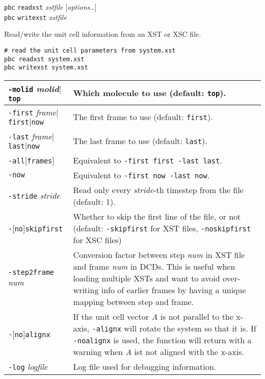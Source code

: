 \documentclass[a4paper, DIV12]{scrartcl}
\begin{document}
\texttt{pbc} \texttt{readxst} \textit{xstfile} [\textit{options}\dots]\\
\texttt{pbc} \texttt{writexst} \textit{xstfile}

Read/write the unit cell information from an XST or XSC file.

\begin{Verbatim}
# read the unit cell parameters from system.xst
pbc readxst system.xst
pbc writexst system.xst
\end{Verbatim}


\begin{tabular}{|p{}|p{}|}
\hline

\texttt{-molid} \textit{molid}$|$\texttt{top}
& Which molecule to use (default: \texttt{top}).
\\ \hline

\texttt{-first} \textit{frame}$|$\texttt{first}$|$\texttt{now}
& The first frame to use (default: \texttt{first}).
\\ \hline

\texttt{-last} \textit{frame}$|$\texttt{last}$|$\texttt{now}
& The last frame to use (default: \texttt{last}).
\\ \hline

\texttt{-all}[\texttt{frames}]
& Equivalent to \texttt{-first first -last last}.
\\ \hline

\texttt{-now}
& Equivalent to \texttt{-first now -last now}.
\\ \hline

\texttt{-stride} \textit{stride}
& Read only every \textit{stride}-th timestep from the
file (default: 1).
\\ \hline

\texttt{-}[\texttt{no}]\texttt{skipfirst}
& Whether to skip the first line of the file, or not
(default: \texttt{-skipfirst} for XST files, \texttt{-noskipfirst} for
XSC files)
\\ \hline

\texttt{-step2frame} \textit{num}
& Conversion factor between step \textit{num} in XST file
and frame \textit{num} in DCDs. This is useful when loading multiple
XSTs and want to avoid over-writing info of earlier frames
by having a unique mapping between step and frame.
\\ \hline

\texttt{-}[\texttt{no}]\texttt{alignx}
& If the unit cell vector \textit{A} is not parallel to the x-axis,
\texttt{-alignx} will rotate the system so that it is. If
\texttt{-noalignx} is used, the function will return with a warning
when \textit{A} ist not aligned with the x-axis.
\\ \hline

\texttt{-log} \textit{logfile}
& Log file used for debugging information.
\\ \hline
\end{tabular}
\end{document}
